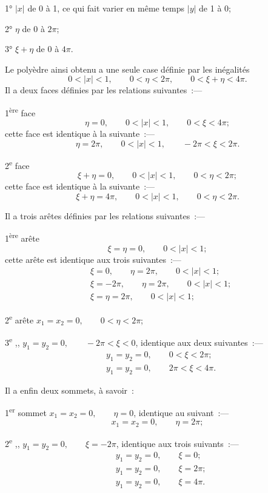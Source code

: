 \documentclass{article}
\begin{document}
1° $|x|$ de 0 à 1, ce qui fait varier en même temps $|y|$ de 1 à 0;

2° $\eta$ de 0 à $2\pi$;

3° $\xi+\eta$ de 0 à $4\pi$.

Le polyèdre ainsi obtenu a une seule case définie par les inégalités
\[ 0 < |x| < 1, \qquad 0 < \eta < 2\pi, \qquad 0 < \xi+\eta < 4\pi. \]
Il a deux faces définies par les relations suivantes~:---

1\textsuperscript{ère} face
\[ \eta = 0, \qquad 0 < |x| < 1, \qquad 0 < \xi < 4\pi; \]
cette face est identique à la suivante~:---
\[ \eta = 2\pi, \qquad 0 < |x| < 1, \qquad -2\pi < \xi < 2\pi. \]

2\textsuperscript{e} face
\[ \xi+\eta = 0, \qquad 0 < |x| < 1, \qquad 0 < \eta < 2\pi; \]
cette face est identique à la suivante~:---
\[ \xi+\eta = 4\pi, \qquad 0 < |x| < 1, \qquad 0 < \eta < 2\pi. \]

Il a trois arêtes définies par les relations suivantes~:---

1\textsuperscript{ère} arête
\[ \xi = \eta = 0, \qquad 0 < |x| < 1; \]
cette arête est identique aux trois suivantes~:---
\[ \begin{aligned} &\xi = 0, \qquad \eta = 2\pi, \qquad 0 < |x| < 1;\\ &\xi = -2\pi, \qquad \eta = 2\pi, \qquad 0 < |x| < 1;\\ &\xi = \eta = 2\pi, \qquad 0 < |x| < 1; \end{aligned} \]

2\textsuperscript{e} arête $x_{1} = x_{2} = 0, \qquad 0 < \eta < 2\pi$;

3\textsuperscript{e} ,, $y_{1} = y_{2} = 0, \qquad-2\pi < \xi < 0$, identique aux deux suivantes~:---
\[ \begin{aligned} &y_{1} = y_{2} = 0, \qquad 0 < \xi < 2\pi;\\ &y_{1} = y_{2} = 0, \qquad 2\pi < \xi < 4\pi. \end{aligned} \]

Il a enfin deux sommets, à savoir~:

1\textsuperscript{er} sommet $x_{1} = x_{2} = 0, \qquad\eta = 0$, identique au suivant~:---
\[ x_{1} = x_{2} = 0, \qquad \eta = 2\pi; \]

2\textsuperscript{e} ,, $y_{1} = y_{2} = 0, \qquad\xi = -2\pi$, identique aux trois suivants~:---
\[ \begin{aligned} &y_{1} = y_{2} = 0, \qquad \xi = 0;\\ &y_{1} = y_{2} = 0, \qquad \xi = 2\pi;\\ &y_{1} = y_{2} = 0, \qquad \xi = 4\pi. \end{aligned} \]
\end{document}
